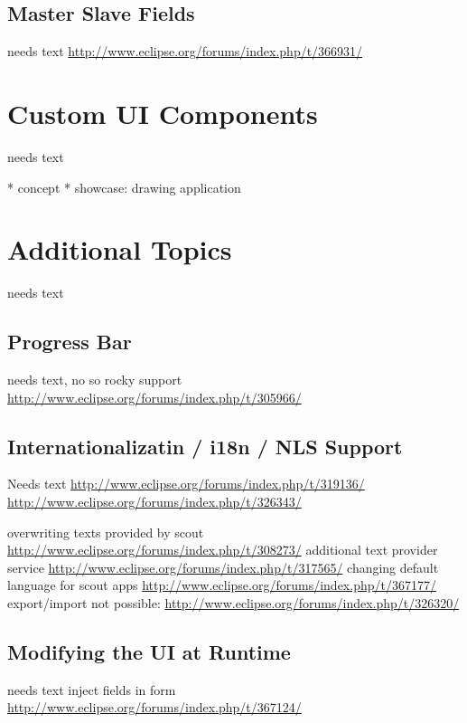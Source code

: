 \documentclass[a4paper,10pt,twoside]{book}
\begin{document}
\section{Master Slave Fields}
needs text
\url{http://www.eclipse.org/forums/index.php/t/366931/}

\chapter{Custom UI Components}
needs text

  * concept
  * showcase: drawing application
    
\chapter{Additional Topics}
needs text

\section{Progress Bar}
needs text, no so rocky support \url{http://www.eclipse.org/forums/index.php/t/305966/}

\section{Internationalizatin / i18n / NLS Support}
Needs text 
\url{http://www.eclipse.org/forums/index.php/t/319136/}
\url{http://www.eclipse.org/forums/index.php/t/326343/}

overwriting texts provided by scout \url{http://www.eclipse.org/forums/index.php/t/308273/}
additional text provider service \url{http://www.eclipse.org/forums/index.php/t/317565/}
changing default language for scout apps \url{http://www.eclipse.org/forums/index.php/t/367177/}
export/import not possible: \url{http://www.eclipse.org/forums/index.php/t/326320/}

\section{Modifying the UI at Runtime}
needs text
inject fields in form \url{http://www.eclipse.org/forums/index.php/t/367124/}
\end{document}
